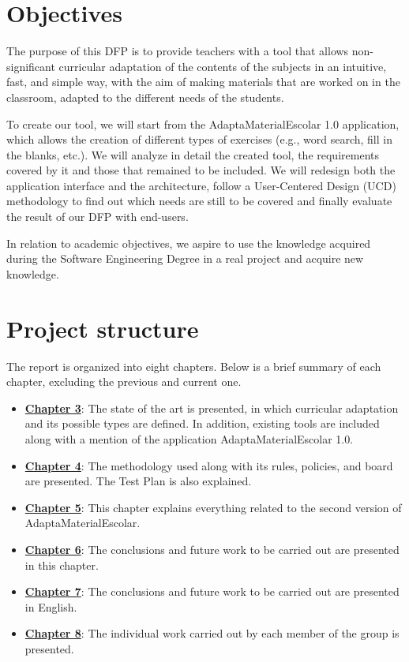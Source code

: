 \section{Objectives}\label{cap:objetives}
The purpose of this DFP is to provide teachers with a tool that allows non-significant curricular adaptation of the contents of the subjects in an intuitive, fast, and simple way, with the aim of making materials that are worked on in the classroom, adapted to the different needs of the students.

To create our tool, we will start from the AdaptaMaterialEscolar 1.0 application, which allows the creation of different types of exercises (e.g., word search, fill in the blanks, etc.). We will analyze in detail the created tool, the requirements covered by it and those that remained to be included. We will redesign both the application interface and the architecture, follow a  User-Centered Design (UCD) methodology to find out which needs are still to be covered and finally evaluate the result of our DFP with end-users.

In relation to academic objectives, we aspire to use the knowledge acquired during the Software Engineering Degree in a real project and acquire new knowledge.

\section{Project structure}\label{cap:Projectstructure}
The report is organized into eight chapters. Below is a brief summary of each chapter, excluding the previous and current one.
\begin{itemize}
\item \textbf{\hyperref[cap:estadoDelArte]{Chapter 3}}: The state of the art is presented, in which curricular adaptation and its possible types are defined. In addition, existing tools are included along with a mention of the application AdaptaMaterialEscolar 1.0.
\item \textbf{\hyperref[cap:metodologia]{Chapter 4}}: The methodology used along with its rules, policies, and board are presented. The Test Plan is also explained.
\item \textbf{\hyperref[cap:AdaptaMaterialEscolar2.0]{Chapter 5}}: This chapter explains everything related to the second version of AdaptaMaterialEscolar.
\item \textbf{\hyperref[cap:conclusiones]{Chapter 6}}: The conclusions and future work to be carried out are presented in this chapter.
\item \textbf{\hyperref[cap:conclusions]{Chapter 7}}: The conclusions and future work to be carried out are presented in English.
\item \textbf{\hyperref[cap:TrabajoIndividual]{Chapter 8}}: The individual work carried out by each member of the group is presented.
\end{itemize}